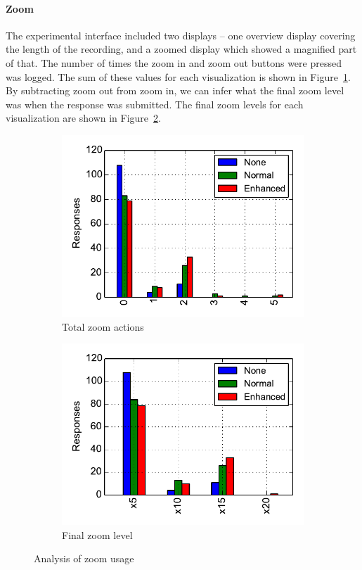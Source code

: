 \paragraph{Zoom}
The experimental interface included two displays -- one overview display
covering the length of the recording, and a zoomed display which showed a
magnified part of that. The number of times the zoom in and zoom out buttons
were pressed was logged. The sum of these values for each visualization is
shown in Figure~\ref{fig:zoomtotal}. By subtracting zoom out from zoom in, we
can infer what the final zoom level was when the response was submitted. The
final zoom levels for each visualization are shown in
Figure~\ref{fig:zoomfinal}.

\begin{figure}[h!]
\centering
\begin{subfigure}{.5\textwidth}
  \centering
  \includegraphics[width=\linewidth]{figs/zoomtotal.pdf}
  \caption{Total zoom actions}
  \label{fig:zoomtotal}
\end{subfigure}%
\begin{subfigure}{.5\textwidth}
  \centering
  \includegraphics[width=\linewidth]{figs/zoomfinal.pdf}
  \caption{Final zoom level}
  \label{fig:zoomfinal}
\end{subfigure}
\caption{Analysis of zoom usage}
\label{fig:zoom}
\end{figure}

